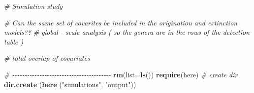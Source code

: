 \documentclass[
]{article}
\newenvironment{Shaded}{\begin{snugshade}}{\end{snugshade}}
\newcommand{\AttributeTok}[1]{\textcolor[rgb]{0.13,0.29,0.53}{#1}}
\newcommand{\CommentTok}[1]{\textcolor[rgb]{0.56,0.35,0.01}{\textit{#1}}}
\newcommand{\FunctionTok}[1]{\textcolor[rgb]{0.13,0.29,0.53}{\textbf{#1}}}
\newcommand{\NormalTok}[1]{#1}
\newcommand{\StringTok}[1]{\textcolor[rgb]{0.31,0.60,0.02}{#1}}
\begin{document}
{\begin{Shaded}
\begin{Highlighting}[]
\CommentTok{\# Simulation study}

\CommentTok{\# Can the same set of covarites be included in the origination and extinction models??}
\CommentTok{\# global {-} scale analysis ( so the genera are in the rows of the detection table )}

\CommentTok{\# total overlap of covariates }

\CommentTok{\# {-}{-}{-}{-}{-}{-}{-}{-}{-}{-}{-}{-}{-}{-}{-}{-}{-}{-}{-}{-}{-}{-}{-}{-}{-}{-}{-}{-}{-}{-}{-}{-}{-}{-}{-}{-}{-}{-}{-}{-}}
\FunctionTok{rm}\NormalTok{(}\AttributeTok{list=}\FunctionTok{ls}\NormalTok{())}
\FunctionTok{require}\NormalTok{(here)}
\CommentTok{\# create dir}
\FunctionTok{dir.create}\NormalTok{ (}\FunctionTok{here}\NormalTok{ (}\StringTok{"simulations"}\NormalTok{, }\StringTok{"output"}\NormalTok{))}


\end{Highlighting}
\end{Shaded}}
\end{document}
